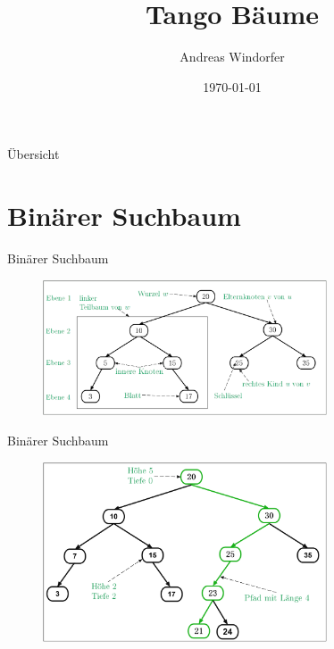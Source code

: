 \documentclass[11pt]{beamer}
\begin{document}
	\author{Andreas Windorfer}
	\title{Tango Bäume}
	\date{\today}
	\begin{frame}{}
		\titlepage
	\end{frame}
	\begin{frame} {Übersicht}
		\tableofcontents[]   
		
	\end{frame}
	
	\section{Binärer Suchbaum}
	
	
		\begin{frame} {Binärer Suchbaum}
			\begin{figure}[h]
				\centering
				\includegraphics[width=0.75\textwidth]{"Medien/pres/ioSuchbaum"}
			\end{figure}    
		\end{frame}

			\begin{frame} {Binärer Suchbaum}
			\begin{figure}[h]
				\centering
				\includegraphics[width=0.75\textwidth]{"Medien/pres/suchbaum2_2"}
			\end{figure}    
		\end{frame}
\end{document}
